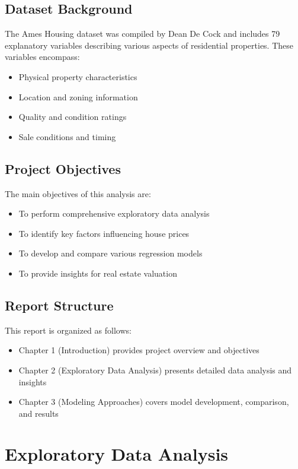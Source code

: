 \documentclass[12pt]{report}
\begin{document}
\section{Dataset Background}
The Ames Housing dataset was compiled by Dean De Cock and includes 79 explanatory variables describing various aspects of residential properties. These variables encompass:
\begin{itemize}
    \item Physical property characteristics
    \item Location and zoning information
    \item Quality and condition ratings
    \item Sale conditions and timing
\end{itemize}

\section{Project Objectives}
The main objectives of this analysis are:
\begin{itemize}
    \item To perform comprehensive exploratory data analysis
    \item To identify key factors influencing house prices
    \item To develop and compare various regression models
    \item To provide insights for real estate valuation
\end{itemize}

\section{Report Structure}
This report is organized as follows:
\begin{itemize}
    \item Chapter 1 (Introduction) provides project overview and objectives
    \item Chapter 2 (Exploratory Data Analysis) presents detailed data analysis and insights
    \item Chapter 3 (Modeling Approaches) covers model development, comparison, and results
\end{itemize}

\chapter{Exploratory Data Analysis}
\end{document}
